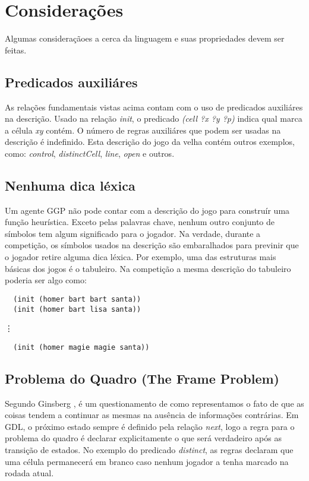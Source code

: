 \section{Considerações}
Algumas consideraçãoes a cerca da linguagem e suas propriedades devem ser feitas.

\subsection{Predicados auxiliáres}
As relações fundamentais vistas acima contam com o uso de predicados auxiliáres na descrição. Usado na relação \textit{init}, o predicado \textit{(cell ?x ?y ?p)} indica qual marca a célula \textit{xy} contém. O número de regras auxiliáres que podem ser usadas na descrição é indefinido. Esta descrição do jogo da velha contém outros exemplos, como: \textit{control}, \textit{distinctCell}, \textit{line}, \textit{open} e outros.

\subsection{Nenhuma dica léxica}
Um agente GGP não pode contar com a descrição do jogo para construír uma função heurística. Exceto pelas palavras chave, nenhum outro conjunto de símbolos tem algum significado para o jogador. Na verdade, durante a competição, os símbolos usados na descrição são embaralhados para previnir que o jogador retire alguma dica léxica. Por exemplo, uma das estruturas mais básicas dos jogos é o tabuleiro. Na competição a mesma descrição do tabuleiro poderia ser algo como:
\begin{verbatim}                                                                                         
  (init (homer bart bart santa))                                                                                    
  (init (homer bart lisa santa))                                                                                    
\end{verbatim}
	\hspace{1.5cm} {\LARGE{ \vdots }}
\begin{verbatim}	
  (init (homer magie magie santa))                                                                                                                                                           
\end{verbatim}

\subsection{Problema do Quadro (The Frame Problem)}
Segundo Ginsberg \cite{mginsberg},  é um questionamento de como representamos o fato de que as coisas tendem a continuar as mesmas na ausência de informações contrárias. Em GDL, o próximo estado sempre é definido pela relação \textit{next}, logo a regra para o problema do quadro é declarar explicitamente o que será verdadeiro após as transição de estados. 
No exemplo do predicado \textit{distinct}, as regras declaram que uma célula permanecerá em branco caso nenhum jogador a tenha marcado na rodada atual. 

